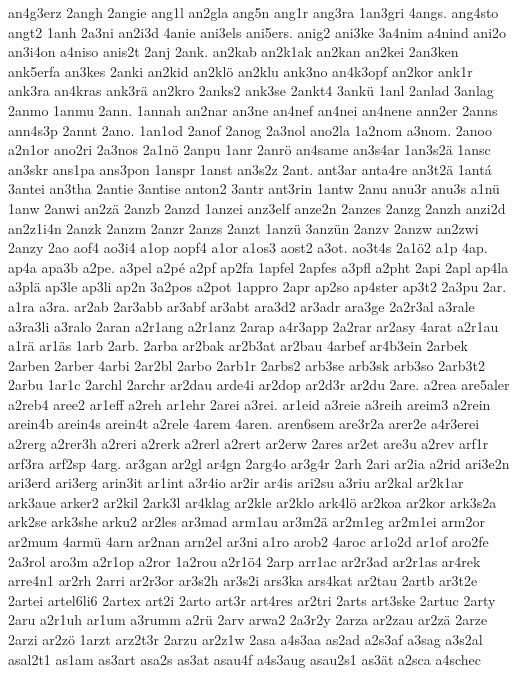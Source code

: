 {an4g3erz
2angh
2angie
ang1l
an2gla
ang5n
ang1r
ang3ra
1an3gri
4angs.
ang4sto
angt2
1anh
2a3ni
an2i3d
4anie
ani3els
ani5ers.
anig2
ani3ke
3a4nim
a4nind
ani2o
an3i4on
a4niso
anis2t
2anj
2ank.
an2kab
an2k1ak
an2kan
an2kei
2an3ken
ank5erfa
an3kes
2anki
an2kid
an2klö
an2klu
ank3no
an4k3opf
an2kor
ank1r
ank3ra
an4kras
ank3rä
an2kro
2anks2
ank3se
2ankt4
3ankü
1anl
2anlad
3anlag
2anmo
1anmu
2ann.
1annah
an2nar
an3ne
an4nef
an4nei
an4nene
ann2er
2anns
ann4s3p
2annt
2ano.
1an1od
2anof
2anog
2a3nol
ano2la
1a2nom
a3nom.
2anoo
a2n1or
ano2ri
2a3nos
2a1nö
2anpu
1anr
2anrö
an4same
an3s4ar
1an3s2ä
1ansc
an3skr
ans1pa
ans3pon
1anspr
1anst
an3s2z
2ant.
ant3ar
anta4re
an3t2ä
1antá
3antei
an3tha
2antie
3antise
anton2
3antr
ant3rin
1antw
2anu
anu3r
anu3s
a1nü
1anw
2anwi
an2zä
2anzb
2anzd
1anzei
anz3elf
anze2n
2anzes
2anzg
2anzh
anzi2d
an2z1i4n
2anzk
2anzm
2anzr
2anzs
2anzt
1anzü
3anzün
2anzv
2anzw
an2zwi
2anzy
2ao
aof4
ao3i4
a1op
aopf4
a1or
a1os3
aost2
a3ot.
ao3t4s
2a1ö2
a1p
4ap.
ap4a
apa3b
a2pe.
a3pel
a2pé
a2pf
ap2fa
1apfel
2apfes
a3pfl
a2pht
2api
2apl
ap4la
a3plä
ap3le
ap3li
ap2n
3a2pos
a2pot
1appro
2apr
ap2so
ap4ster
ap3t2
2a3pu
2ar.
a1ra
a3ra.
ar2ab
2ar3abb
ar3abf
ar3abt
ara3d2
ar3adr
ara3ge
2a2r3al
a3rale
a3ra3li
a3ralo
2aran
a2r1ang
a2r1anz
2arap
a4r3app
2a2rar
ar2asy
4arat
a2r1au
a1rä
ar1äs
1arb
2arb.
2arba
ar2bak
ar2b3at
ar2bau
4arbef
ar4b3ein
2arbek
2arben
2arber
4arbi
2ar2bl
2arbo
2arb1r
2arbs2
arb3se
arb3sk
arb3so
2arb3t2
2arbu
1ar1c
2archl
2archr
ar2dau
arde4i
ar2dop
ar2d3r
ar2du
2are.
a2rea
are5aler
a2reb4
aree2
ar1eff
a2reh
ar1ehr
2arei
a3rei.
ar1eid
a3reie
a3reih
areim3
a2rein
arein4b
arein4s
arein4t
a2rele
4arem
4aren.
aren6sem
are3r2a
arer2e
a4r3erei
a2rerg
a2rer3h
a2reri
a2rerk
a2rerl
a2rert
ar2erw
2ares
ar2et
are3u
a2rev
arf1r
arf3ra
arf2sp
4arg.
ar3gan
ar2gl
ar4gn
2arg4o
ar3g4r
2arh
2ari
ar2ia
a2rid
ari3e2n
ari3erd
ari3erg
arin3it
ar1int
a3r4io
ar2ir
ar4is
ari2su
a3riu
ar2kal
ar2k1ar
ark3aue
arker2
ar2kil
2ark3l
ar4klag
ar2kle
ar2klo
ark4lö
ar2koa
ar2kor
ark3s2a
ark2se
ark3she
arku2
ar2les
ar3mad
arm1au
ar3m2ä
ar2m1eg
ar2m1ei
arm2or
ar2mum
4armü
4arn
ar2nan
arn2el
ar3ni
a1ro
arob2
4aroc
ar1o2d
ar1of
aro2fe
2a3rol
aro3m
a2r1op
a2ror
1a2rou
a2r1ö4
2arp
arr1ac
ar2r3ad
ar2r1as
ar4rek
arre4n1
ar2rh
2arri
ar2r3or
ar3s2h
ar3s2i
ars3ka
ars4kat
ar2tau
2artb
ar3t2e
2artei
artel6li6
2artex
art2i
2arto
art3r
art4res
ar2tri
2arts
art3ske
2artuc
2arty
2aru
a2r1uh
ar1um
a3rumm
a2rü
2arv
arwa2
2a3r2y
2arza
ar2zau
ar2zä
2arze
2arzi
ar2zö
1arzt
arz2t3r
2arzu
ar2z1w
2asa
a4s3aa
as2ad
a2s3af
a3sag
a3s2al
asal2t1
as1am
as3art
asa2s
as3at
asau4f
a4s3aug
asau2s1
as3ät
a2sca
a4schec
}
